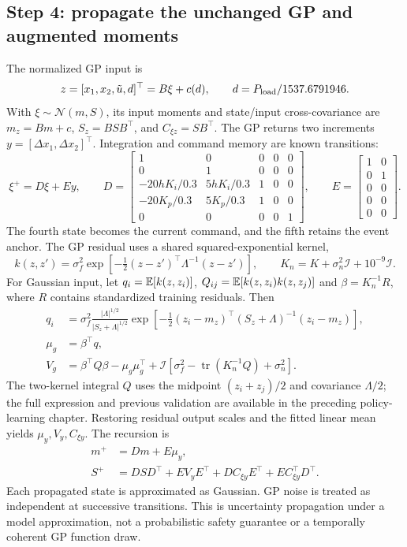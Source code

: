 \subsection{Step 4: propagate the unchanged GP and augmented moments}
The normalized GP input is
\begin{equation}
z=[x_1,x_2,\tilde u,d]^\top=B\xi+c(d),\qquad d=P_{\rm load}/1537.6791946.
\end{equation}
With $\xi\sim\mathcal N(m,S)$, its input moments and state/input cross-covariance are $m_z=Bm+c$, $S_z=BSB^\top$, and $C_{\xi z}=SB^\top$. The GP returns two increments $y=[\Delta x_1,\Delta x_2]^\top$. Integration and command memory are known transitions:
\begin{equation}
\xi^+=D\xi+Ey,\qquad
D=\begin{bmatrix}
1&0&0&0&0\\0&1&0&0&0\\-20hK_i/0.3&5hK_i/0.3&1&0&0\\
-20K_p/0.3&5K_p/0.3&1&0&0\\0&0&0&0&1
\end{bmatrix},\qquad E=\begin{bmatrix}1&0\\0&1\\0&0\\0&0\\0&0\end{bmatrix}.
\end{equation}
The fourth state becomes the current command, and the fifth retains the event anchor. The GP residual uses a shared squared-exponential kernel,
\begin{equation}
k(z,z')=\sigma_f^2\exp[-\tfrac12(z-z')^\top\Lambda^{-1}(z-z')],\qquad K_n=K+\sigma_n^2\mathcal I+10^{-9}\mathcal I.
\end{equation}
For Gaussian input, let $q_i=\mathbb{E}[k(z,z_i)]$, $Q_{ij}=\mathbb{E}[k(z,z_i)k(z,z_j)]$ and $\beta=K_n^{-1}R$, where $R$ contains standardized training residuals. Then
\begin{align}
q_i&=\sigma_f^2\frac{|\Lambda|^{1/2}}{|S_z+\Lambda|^{1/2}}
\exp[-\tfrac12(z_i-m_z)^\top(S_z+\Lambda)^{-1}(z_i-m_z)],\\
\mu_g&=\beta^\top q,\\
V_g&=\beta^\top Q\beta-\mu_g\mu_g^\top+
\mathcal I[\sigma_f^2-\operatorname{tr}(K_n^{-1}Q)+\sigma_n^2].
\end{align}
The two-kernel integral $Q$ uses the midpoint $(z_i+z_j)/2$ and covariance $\Lambda/2$; the full expression and previous validation are available in the preceding policy-learning chapter. Restoring residual output scales and the fitted linear mean yields $\mu_y,V_y,C_{\xi y}$. The recursion is
\begin{align}
m^+&=Dm+E\mu_y,\\
S^+&=DSD^\top+EV_yE^\top+DC_{\xi y}E^\top+EC_{\xi y}^\top D^\top.
\end{align}
Each propagated state is approximated as Gaussian. GP noise is treated as independent at successive transitions. This is uncertainty propagation under a model approximation, not a probabilistic safety guarantee or a temporally coherent GP function draw.

